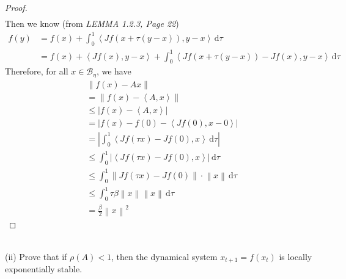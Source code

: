 \documentclass[a4paper,11pt,reqno]{amsart}
\newcommand{\dd}{\mathrm{d}}
\begin{document}
\begin{proof}
\begin{align}
\end{align}
Then we know (from \emph{LEMMA 1.2.3, Page 22})\cite{Optimization}
\begin{align}
    f(y)&=f(x)+\int_{0}^{1}\left\langle Jf(x+\tau(y-x)),y-x \right \rangle \,\dd\tau
    \\
    &=f(x)+\left \langle Jf(x),y-x \right \rangle+\int_{0}^{1}\left\langle Jf(x+\tau(y-x))-Jf(x),y-x \right \rangle \,\dd\tau
\end{align}
Therefore, for all $x\in \mathcal{B}_{\eta}$, we have
\begin{align}
    &\left\lVert f(x)-Ax\right\rVert
    \\
    &=\left\lVert f(x)-\left\langle A,x \right\rangle\right\rVert
    \\
    &\leq\left\lvert f(x)-\left\langle A,x \right\rangle\right\rvert
    \\
    &=\left\lvert f(x)-f(0)-\left\langle Jf(0),x-0 \right\rangle\right\rvert
    \\
    &=\left\lvert \int_{0}^{1}\left\langle Jf(\tau x)-Jf(0),x \right \rangle \,\dd\tau\right\rvert 
    \\
    &\leq \int_{0}^{1}\left\lvert \left\langle Jf(\tau x)-Jf(0),x \right \rangle \right\rvert \,\dd\tau
    \\
    &\leq \int_{0}^{1}\left\lVert Jf(\tau x)-Jf(0) \right\rVert \cdot \left\lVert x\right\rVert \,\dd\tau
    \\
    &\leq \int_{0}^{1}\tau\beta\left\lVert x \right\rVert \left\lVert x\right\rVert \,\dd\tau
    \\
    &=\frac{\beta}{2}\left\lVert x \right\rVert ^2
\end{align}

\end{proof}
\
\\
(ii) Prove that if $\rho(A)<1$, then the dynamical system $x_{t+1}=f(x_t)$ is locally exponentially stable.
\\
\end{document}
